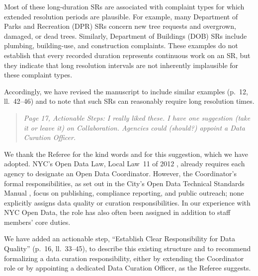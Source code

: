 \documentclass[12pt]{article}
\newenvironment{comment}
{\begin{quotation}\noindent\small\itshape\color{darkblue}\ignorespaces}
{\end{quotation}}
\begin{document}
Most of these long-duration SRs are associated with complaint types for
which extended resolution periods are plausible. For example, many
Department of Parks and Recreation (DPR) SRs concern new tree requests
and overgrown, damaged, or dead trees. Similarly, Department of Buildings
(DOB) SRs include plumbing, building-use, and construction complaints.
These examples do not establish that every recorded duration represents
continuous work on an SR, but they indicate that long resolution intervals
are not inherently implausible for these complaint types.

Accordingly, we have revised the manuscript to include 
similar examples (p.~12, ll.~42--46) and to note that such 
SRs can reasonably require long resolution times.

\FloatBarrier
\begin{comment}
Page 17, Actionable Steps: I really liked these. I have one
suggestion (take it or leave it) on Collaboration. Agencies could
(should?) appoint a Data Curation Officer.
\end{comment}

We thank the Referee for the kind words and for this suggestion,
which we have adopted. NYC's Open Data Law, Local Law~11 of 2012
\citep{nyc_ll11}, already requires each agency to designate an Open
Data Coordinator. However, the Coordinator's formal responsibilities,
as set out in the City's Open Data Technical Standards Manual
\citep{nyc_tsm}, focus on publishing, compliance reporting, and public
outreach; none explicitly assigns data quality or curation
responsibilities. In our experience with NYC Open Data, the role has also
often been assigned in addition to staff members' core duties.

We have added an actionable step, ``Establish Clear Responsibility for
Data Quality'' (p.~16, ll.~33--45), to describe
this existing structure and to recommend formalizing a data curation
responsibility, either by extending the Coordinator role or by
appointing a dedicated Data Curation Officer, as the Referee suggests.
\end{document}
